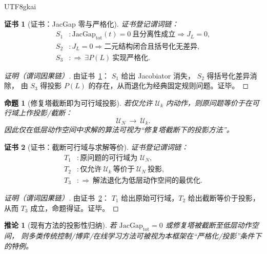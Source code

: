 \documentclass[12pt]{article}
\newtheorem{proposition}{命题}[section]
\newtheorem{corollary}{推论}[section]
\newtheorem{Certificate}{证书}[section]
\newcommand{\JacGap}{\ensuremath{\mathrm{JacGap}}} %
\begin{document}
\begin{CJK*}{UTF8}{gkai}
\begin{Certificate}[证书：JacGap 零与严格化]
\label{cert:jacgap-zero-strictification}
证书登记谓词链：
\[
\begin{aligned}
  S_1 &: \JacGap_{\mathrm{tot}}(t)=0\ \text{且分离性成立}\Rightarrow J_L=0,\\
  S_2 &: J_L=0\Rightarrow \text{二元结构闭合且括号化无差异},\\
  S_3 &: \Rightarrow\ \exists P(L)\ \text{实现严格化}.
\end{aligned}
\]
\end{Certificate}

\begin{proof}[证明（谓词因果链）]
由证书~\ref{cert:jacgap-zero-strictification}：
$S_1$ 给出 Jacobiator 消失，
$S_2$ 得括号化差异消除，
由 $S_3$ 得投影 $P(L)$ 的存在，从而退化为经典固定规则问题。证毕。
\end{proof}

\begin{proposition}[修复塔截断即为可行域投影]
\label{prop:repair-tower-truncation-projection}
若仅允许 $\mathcal{U}_k$ 内动作，则原问题等价于在可行域上作投影/截断：
\[
  \mathcal{U}_N\ \longrightarrow\ \mathcal{U}_k.
\]
因此仅在低层动作空间中求解的算法可视为“修复塔截断下的投影方法”。
\end{proposition}

\begin{Certificate}[证书：截断可行域与求解等价]
\label{cert:repair-tower-truncation-projection}
证书登记谓词链：
\[
\begin{aligned}
  T_1 &: \text{原问题的可行域为 }\mathcal{U}_N,\\
  T_2 &: \text{仅允许}\ \mathcal{U}_k\ \text{等价于}\ \mathcal{U}_N\ \text{投影},\\
  T_3 &: \Rightarrow\ \text{解法退化为低层动作空间的最优化}.
\end{aligned}
\]
\end{Certificate}

\begin{proof}[证明（谓词因果链）]
由证书~\ref{cert:repair-tower-truncation-projection}：
$T_1$ 给出原始可行域，$T_2$ 给出截断等价于投影，
从而 $T_3$ 成立，命题得证。证毕。
\end{proof}

\begin{corollary}[现有方法的投影性归纳]
\label{cor:existing-methods-projection}
若 $\JacGap_{\mathrm{tot}}=0$ 或修复塔被截断至低层动作空间，
则多类传统控制/博弈/在线学习方法可被视为本框架在“严格化/投影”条件下的特例。
\end{corollary}


\end{CJK*}
\end{document}
